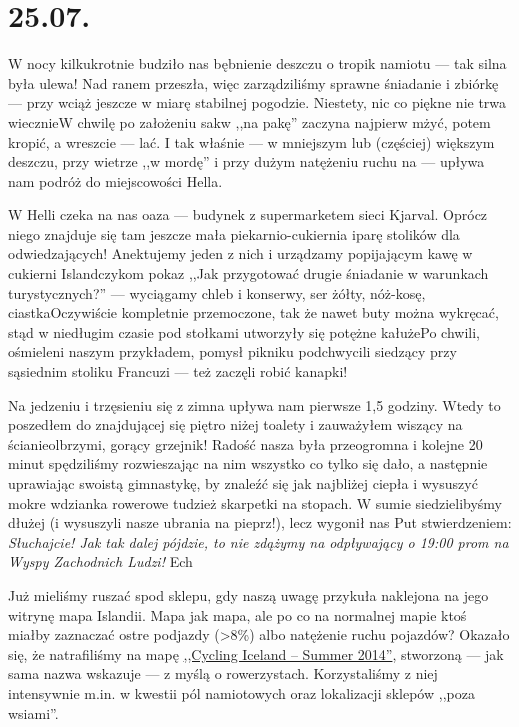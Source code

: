 \chapter*{25.07.}

W nocy kilkukrotnie budziło nas bębnienie deszczu o tropik namiotu --- tak silna była ulewa! Nad ranem przeszła, więc zarządziliśmy sprawne śniadanie i zbiórkę --- przy wciąż jeszcze w miarę stabilnej pogodzie. Niestety, nic co piękne nie trwa wiecznie\textellipsis W chwilę po założeniu sakw ,,na pakę'' zaczyna najpierw mżyć, potem kropić, a wreszcie --- lać. I tak właśnie --- w mniejszym lub (częściej) większym deszczu, przy wietrze ,,w mordę'' i przy dużym natężeniu ruchu na  --- upływa nam podróż do miejscowości Hella.

W Helli czeka na nas oaza --- budynek z supermarketem sieci Kjarval. Oprócz niego znajduje się tam jeszcze mała piekarnio-cukiernia i\textellipsis parę stolików dla odwiedzających! Anektujemy jeden z nich i urządzamy popijającym kawę w cukierni Islandczykom pokaz ,,Jak przygotować drugie śniadanie w warunkach turystycznych?'' --- wyciągamy chleb i konserwy, ser żółty, nóż-kosę, ciastka\textellipsis Oczywiście kompletnie przemoczone, tak że nawet buty można wykręcać, stąd w niedługim czasie pod stołkami utworzyły się potężne kałuże\textellipsis Po chwili, ośmieleni naszym przykładem, pomysł pikniku podchwycili siedzący przy sąsiednim stoliku Francuzi --- też zaczęli robić kanapki!

Na jedzeniu i trzęsieniu się z zimna upływa nam pierwsze 1,5 godziny. Wtedy to poszedłem do znajdującej się piętro niżej toalety i zauważyłem wiszący na ścianie\textellipsis olbrzymi, gorący grzejnik! Radość nasza była przeogromna i kolejne 20 minut spędziliśmy rozwieszając na nim wszystko co tylko się dało, a następnie uprawiając swoistą gimnastykę, by znaleźć się jak najbliżej ciepła i wysuszyć mokre wdzianka rowerowe tudzież skarpetki na stopach. W sumie siedzielibyśmy dłużej (i wysuszyli nasze ubrania na pieprz!), lecz wygonił nas Put stwierdzeniem: \emph{Słuchajcie! Jak tak dalej pójdzie, to nie zdążymy na odpływający o 19:00 prom na Wyspy Zachodnich Ludzi!} Ech\textellipsis


Już mieliśmy ruszać spod sklepu, gdy naszą uwagę przykuła naklejona na jego witrynę mapa Islandii. Mapa jak mapa, ale po co na normalnej mapie ktoś miałby zaznaczać ostre podjazdy (>8\%) albo natężenie ruchu pojazdów? Okazało się, że natrafiliśmy na mapę \href{http://www.vegagerdin.is/media/upplysingar-og-utgafa/Cycling-map.pdf}{,,Cycling Iceland -- Summer 2014''}, stworzoną --- jak sama nazwa wskazuje --- z myślą o rowerzystach. Korzystaliśmy z niej intensywnie m.in. w kwestii pól namiotowych oraz lokalizacji sklepów ,,poza wsiami''.

